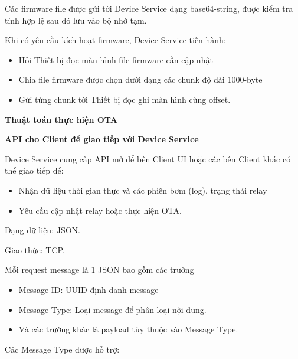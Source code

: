 Các firmware file được gửi tới Device Service dạng base64-string, được kiểm tra tính hợp lệ sau đó lưu vào bộ nhớ tạm.

Khi có yêu cầu kích hoạt firmware, Device Service tiến hành:

\begin{itemize}
    \item Hỏi Thiết bị đọc màn hình file firmware cần cập nhật
    \item Chia file firmware được chọn dưới dạng các chunk độ dài 1000-byte 
    \item Gửi từng chunk tới Thiết bị đọc ghi màn hình cùng offset.
\end{itemize}


\FloatBarrier
\textbf{Thuật toán thực hiện OTA}

\textbf{API cho Client để giao tiếp với Device Service }

Device Service cung cấp API mở để bên Client UI hoặc các bên Client khác có thể giao tiếp để:

\begin{itemize}
    \item Nhận dữ liệu thời gian thực và các phiên bơm (log), trạng thái relay
    \item Yêu cầu cập nhật relay hoặc thực hiện OTA.
\end{itemize}

Dạng dữ liệu: JSON.

Giao thức: TCP.

Mỗi request message là 1 JSON bao gồm các trường

\begin{itemize}
    \item Message ID: UUID định danh message 
    \item Message Type: Loại message để phân loại nội dung.
    \item Và các trường khác là payload tùy thuộc vào Message Type.
\end{itemize}

Các Message Type được hỗ trợ:

